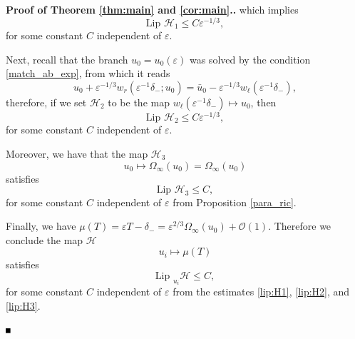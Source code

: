 \documentclass[letterpaper,11pt]{article}
\newcommand{\rmO}{\mathcal{O}}
\newcommand{\eps}{\varepsilon}
\numberwithin{equation}{section}
\theoremstyle{plain}
\newenvironment{Proof}[1][\unskip]%
 {\begin{trivlist} \item[]{\bf Proof #1. }}%
 {\hspace*{\fill}$\rule{.4\baselineskip}{.4\baselineskip}$\end{trivlist}}
\begin{document}
\begin{Proof}[\textbf{ of Theorem \ref{thm:main} and \ref{cor:main}}.]
which implies
\begin{equation}\label{lip:H1}
\text{Lip } \mathcal{H}_1 \le C\eps^{-1/3},
\end{equation}
for some constant $C$ independent of $\eps$.

Next, recall that the branch $u_0 = u_0(\eps)$ was solved by the condition \eqref{match_ab_exp}, from which it reads
\[
u_0+\eps^{-1/3}w_r(\eps^{-1}\delta_-; u_0) = \bar{u}_0 - \eps^{-1/3}w_\ell(\eps^{-1}\delta_-),
\] 
therefore, if we set $\mathcal{H}_2$ to be the map $w_{\ell}(\eps^{-1}\delta_-) \mapsto u_0$, then
\begin{equation}\label{lip:H2}
\text{Lip } \mathcal{H}_2 \le C\eps^{-1/3},
\end{equation}
for some constant $C$ independent of $\eps$.

Moreover, we have that the map $\mathcal{H}_3$ 
\begin{equation}
 u_0 \mapsto \Omega_\infty(u_0)=\Omega_\infty(u_0)
\end{equation}
satisfies
\begin{equation}\label{lip:H3} 
\text{Lip } \mathcal{H}_3 \le C, 
\end{equation}
for some constant $C$ independent of $\eps$ from Proposition \ref{para_ric}.

Finally, we have $\mu(T) = \eps T -\delta_- = \eps^{2/3}\Omega_\infty(u_0) + \rmO(1)$. Therefore we conclude the map $\mathcal{H}$
\begin{equation}
u_i \mapsto \mu(T)
\end{equation}
satisfies 
\begin{equation}
\text{Lip }_{u_i} \mathcal{H} \le C, 
\end{equation}
for some constant $C$ independent of $\eps$ from the estimates \eqref{lip:H1}, \eqref{lip:H2}, and \eqref{lip:H3}.




\end{Proof}
\end{document}
